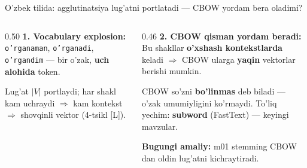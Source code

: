 \documentclass[aspectratio=169,11pt]{beamer}
\begin{document}
\begin{frame}{O'zbek tilida: agglutinatsiya lug'atni portlatadi --- CBOW yordam bera oladimi?}
  \begin{columns}[T]
    \begin{column}{0.50\textwidth}
      \textbf{1. Vocabulary explosion:}\\[3pt]
      \small
      \texttt{o'rganaman}, \texttt{o'rganadi}, \texttt{o'rgandim} ---
      bir o'zak, \textbf{uch alohida} token.\\[3pt]
      \begin{tcolorbox}[warnbox,title=Oqibat,top=2pt,bottom=2pt]
        \footnotesize
        Lug'at $|V|$ portlaydi; har shakl kam uchraydi $\Rightarrow$ kam kontekst
        $\Rightarrow$ shovqinli vektor (4-tsikl [L]).
      \end{tcolorbox}
    \end{column}
    \begin{column}{0.46\textwidth}
      \textbf{2. CBOW qisman yordam beradi:}\\[3pt]
      \small
      Bu shakllar \textbf{o'xshash kontekstlarda} keladi $\Rightarrow$ CBOW
      ularga \textbf{yaqin} vektorlar berishi mumkin.\\[4pt]
      \begin{tcolorbox}[okbox,title=Lekin to'liq emas,top=2pt,bottom=2pt]
        \footnotesize
        CBOW so'zni \textbf{bo'linmas} deb biladi --- o'zak umumiyligini
        ko'rmaydi. To'liq yechim: \textbf{subword} (FastText) --- keyingi
        mavzular.
      \end{tcolorbox}
      \vspace{2pt}
      \footnotesize\textbf{Bugungi amaliy:} m01 stemming CBOW dan oldin lug'atni kichraytiradi.
    \end{column}
  \end{columns}
\end{frame}
\end{document}
